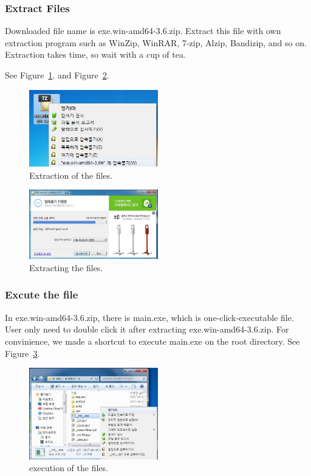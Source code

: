 \documentclass[conference]{IEEEtran}
\begin{document}
  \subsubsection{Extract Files}
    Downloaded file name is exe.win-amd64-3.6.zip. Extract this file with own extraction program such as WinZip, WinRAR, 7-zip, Alzip, Bandizip, and so on.
    Extraction takes time, so wait with a cup of tea.

    See Figure~\ref{fig_extraction}. and Figure~\ref{fig_extracting}.
    \begin{figure}[ht]
    \centering
    \includegraphics[width=0.5\textwidth]{./figures/extraction.jpg}
    \caption{Extraction of the files.}
    \label{fig_extraction}
    \end{figure}

    \begin{figure}[ht]
    \centering
    \includegraphics[width=0.5\textwidth]{./figures/extracting.jpg}
    \caption{Extracting the files.}
    \label{fig_extracting}
    \end{figure}


  \subsubsection{Excute the file} In exe.win-amd64-3.6.zip, there is main.exe, which is one-click-executable file. User only need to double click it after extracting exe.win-amd64-3.6.zip. For convinience, we made a shortcut to execute main.exe on the root directory.
  See Figure~\ref{fig_excution}.
    \begin{figure}[ht]
    \centering
    \includegraphics[width=0.5\textwidth]{./figures/execution.jpg}
    \caption{execution of the files.}
    \label{fig_excution}
    \end{figure}
\end{document}
